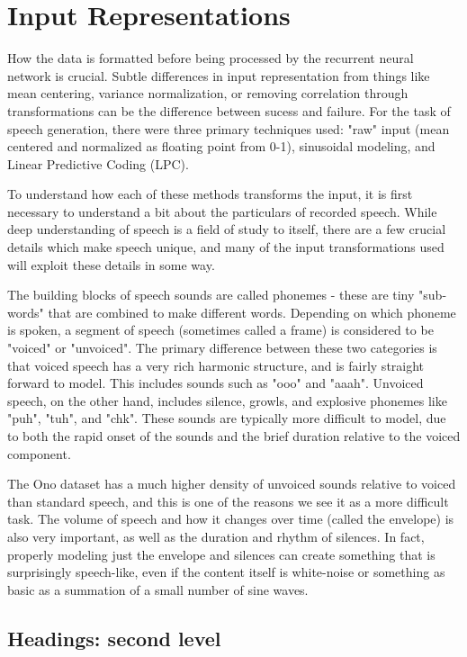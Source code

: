 \documentclass{article} %
\begin{document}
\section{Input Representations}
How the data is formatted before being processed by the recurrent neural
network is crucial. Subtle differences in input representation from things
like mean centering, variance normalization, or removing correlation 
through transformations can be the difference between sucess and failure. For
the task of speech generation, there were three primary techniques
used: "raw" input (mean centered and normalized as floating point from 0-1),
sinusoidal modeling, and Linear Predictive Coding (LPC).
\par
To understand how each of these methods transforms the input, it is first
necessary to understand a bit about the particulars of recorded speech. While
deep understanding of speech is a field of study to itself, there are a few
crucial details which make speech unique, and many of the input 
transformations used will exploit these details in some way.
\par
The building blocks of speech sounds are called phonemes - these are tiny
"sub-words" that are combined to make different words. Depending on which
phoneme is spoken, a segment of speech (sometimes called a frame) is considered
to be "voiced" or "unvoiced". The primary difference between these two
categories is that voiced speech has a very rich harmonic structure,
and is fairly straight forward to model. This includes sounds such as
"ooo" and "aaah". Unvoiced speech, on the other hand, includes silence,
growls, and explosive phonemes like "puh", "tuh", and "chk". These sounds
are typically more difficult to model, due to both the rapid onset of the
sounds and the brief duration relative to the voiced component. 
\par
The Ono
dataset has a much higher density of unvoiced sounds relative to voiced than
standard speech, and this is one of the reasons we see it as a more
difficult task. The volume of speech and how it changes over time (called the
envelope) is also very important, as well as the duration and rhythm of
silences. In fact, properly modeling just the envelope and silences can
create something that is surprisingly speech-like, even if the content
itself is white-noise or something as basic as a summation of a small number
of sine waves.

\subsection{Headings: second level}
\end{document}
